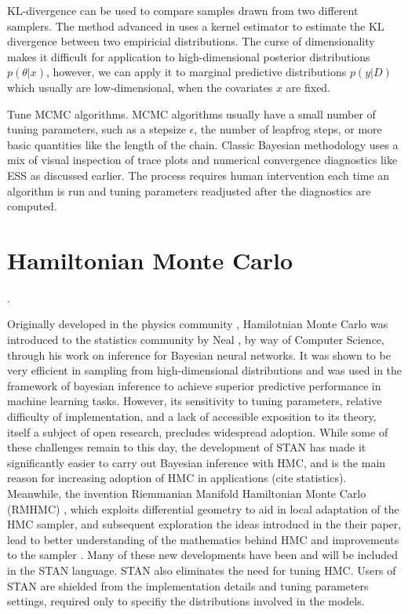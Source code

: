 \documentclass[]{report}
\begin{document}
KL-divergence can be used to compare samples drawn from two different samplers.
The method advanced in \cite{boltz2007knn,boltz2007high} uses a kernel estimator to estimate the KL divergence between two empiricial distributions. The curse of dimensionality makes it difficult for application to high-dimensional posterior distributions $p(\theta|x)$, however, we can apply it to marginal predictive distributions $p(y|D)$ which usually are low-dimensional, when the covariates $x$ are fixed.

Tune MCMC algorithms. MCMC algorithms usually have a small number of tuning
parameters, such as a stepsize $\epsilon$, the number of leapfrog steps, or more
basic quantities like the length of the chain. Classic Bayesian methodology
\cite{robert2013monte} uses a mix of visual inspection of trace plots and
numerical convergence diagnostics like ESS as discussed earlier. The process
requires human intervention each time an algorithm is run and tuning parameters
readjusted after the diagnostics are computed. 


\section{ Hamiltonian Monte Carlo }. 

Originally developed in the physics community \cite{duane1987hybrid},
Hamilotnian Monte Carlo was introduced to the statistics community by Neal
\cite{neal2012bayesian}, 
by way of Computer Science, through his work on inference for Bayesian neural
networks. It was shown to be very efficient in sampling from high-dimensional
distributions and was used in the framework of bayesian inference to achieve superior predictive
performance in machine learning tasks\cite{guyon2004result}. However, its sensitivity to tuning parameters, relative difficulty of
implementation, and a lack of accessible
exposition to its theory, itself a subject of open research, precludes
widespread adoption. While some of these challenges remain to this day, the development of STAN \cite{carpenter2016stan} has made it significantly easier to carry out Bayesian inference with HMC, and is the main reason for increasing adoption of HMC in applications (cite statistics). Meanwhile, the invention Riemmanian Manifold Hamiltonian Monte Carlo (RMHMC) \cite{girolami2011riemann}, which exploits differential geometry to aid in local adaptation of the HMC sampler, and subsequent exploration the ideas introducd in the their paper, lead to better understanding of the mathematics behind HMC \cite{livingstone2016geometric,betancourt2014geometric} and  improvements to the sampler \cite{betancourt2013generalizing,betancourt2013general}. Many of these new developments have been and will be included in the STAN language. STAN also eliminates the need for tuning HMC. Users of STAN are shielded from the implementation details and tuning parameters settings, required only to specifiy the distributions involved in the models. 
\end{document}

